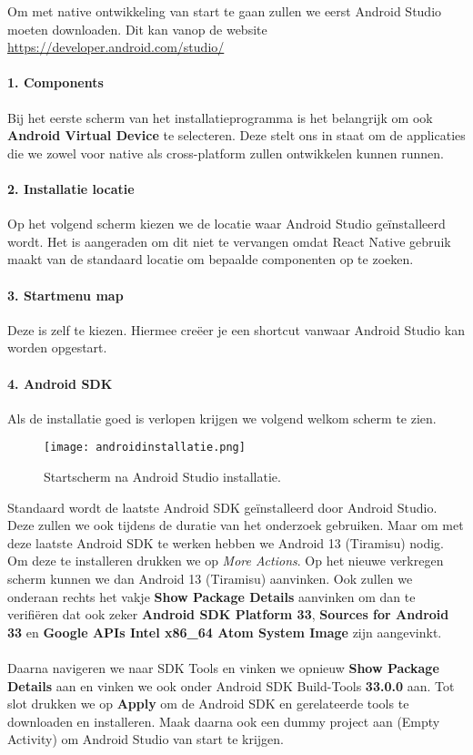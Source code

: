 Om met native ontwikkeling van start te gaan zullen we eerst Android Studio moeten downloaden. 
Dit kan vanop de website \url{https://developer.android.com/studio/}

\paragraph{1. Components}
Bij het eerste scherm van het installatieprogramma is het belangrijk om ook 
\textbf{Android Virtual Device} te selecteren. Deze stelt ons in staat om de applicaties die we 
zowel voor native als cross-platform zullen ontwikkelen kunnen runnen. 

\paragraph{2. Installatie locatie}
Op het volgend scherm kiezen we de locatie waar Android Studio geïnstalleerd wordt. 
Het is aangeraden om dit niet te vervangen omdat React Native gebruik maakt van de standaard 
locatie om bepaalde componenten op te zoeken. 

\paragraph{3. Startmenu map}
Deze is zelf te kiezen. Hiermee creëer je een shortcut vanwaar Android Studio kan worden opgestart.

\paragraph{4. Android SDK}\label{par:sdk}
Als de installatie goed is verlopen krijgen we volgend welkom scherm te zien. 
\begin{figure}[H]
    \centering
    \texttt{[image: androidinstallatie.png]}
    \caption{Startscherm na Android Studio installatie.}
\end{figure}
Standaard wordt de laatste Android SDK geïnstalleerd door Android Studio. 
Deze zullen we ook tijdens de duratie van het onderzoek gebruiken. 
Maar om met deze laatste Android SDK te werken hebben we Android 13 (Tiramisu) nodig. 
Om deze te installeren drukken we op \textit{More Actions}. Op het nieuwe verkregen scherm 
kunnen we dan Android 13 (Tiramisu) aanvinken. Ook zullen we onderaan rechts het vakje 
\textbf{Show Package Details} aanvinken om dan te verifiëren dat ook zeker 
\textbf{Android SDK Platform 33}, \textbf{Sources for Android 33} en 
\textbf{Google APIs Intel x86\_64 Atom System Image} zijn aangevinkt.
\\\\
Daarna navigeren we naar SDK Tools en vinken we opnieuw \textbf{Show Package Details} 
aan en vinken we ook onder Android SDK Build-Tools \textbf{33.0.0} aan. 
Tot slot drukken we op \textbf{Apply} om de Android SDK en gerelateerde tools te downloaden en installeren. 
Maak daarna ook een dummy project aan (Empty Activity) om Android Studio van start te krijgen.

